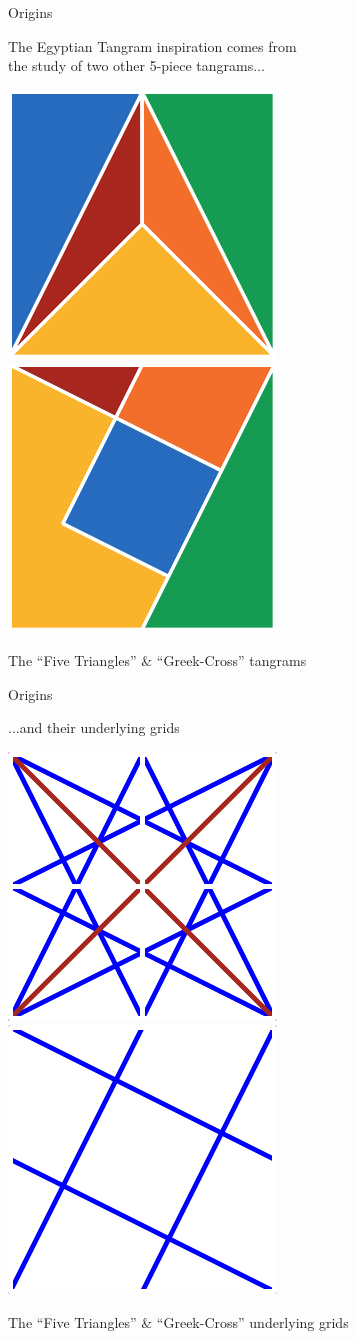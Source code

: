 \documentclass[14pt]{beamer}
\begin{document}
    \begin{frame}{Origins}
        \begin{center}
            The Egyptian Tangram inspiration comes from\\the study of two other 5-piece tangrams...

            \bigskip

            \includegraphics[height=18ex]{figures/figure000a.pdf} \qquad \includegraphics[height=18ex]{figures/figure000b.pdf} \\

            \bigskip

            {\small The ``Five Triangles'' \& ``Greek-Cross'' tangrams}
        \end{center}
    \end{frame}


    \begin{frame}{Origins}
        \begin{center}
            ...and their underlying grids\\\phantom{the study of two other 5-piece tangrams...}

            \bigskip

            \includegraphics[height=18ex]{figures/figure000d.pdf} \qquad \includegraphics[height=18ex]{figures/figure000c.pdf} \\

            \bigskip

            {\small The ``Five Triangles'' \& ``Greek-Cross'' underlying grids}
        \end{center}
    \end{frame}
\end{document}
